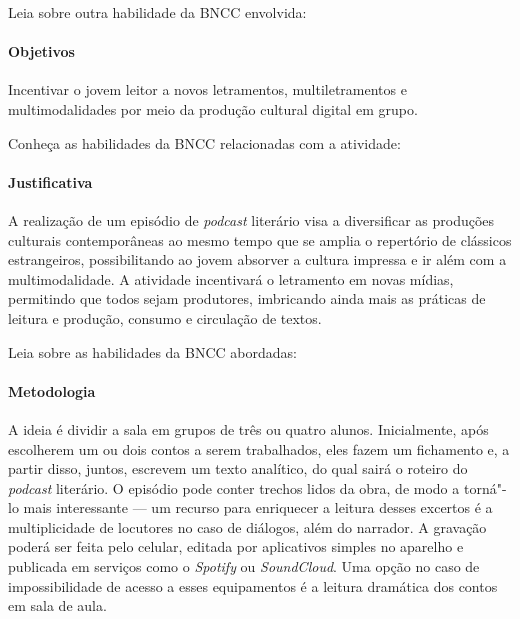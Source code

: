 \documentclass[11pt]{extarticle}
\begin{document}
Leia sobre outra habilidade da BNCC envolvida:

\paragraph{Objetivos}
Incentivar o jovem leitor a novos letramentos, multiletramentos e
multimodalidades por meio da produção cultural digital em grupo.


Conheça as habilidades da BNCC relacionadas com a atividade:

\paragraph{Justificativa}
A realização de um episódio de \emph{podcast} literário visa a
diversificar as produções culturais contemporâneas ao mesmo tempo que se
amplia o repertório de clássicos estrangeiros, possibilitando ao jovem
absorver a cultura impressa e ir além com a multimodalidade. A atividade
incentivará o letramento em novas mídias, permitindo que todos sejam
produtores, imbricando ainda mais as práticas de leitura e produção,
consumo e circulação de textos.

Leia sobre as habilidades da BNCC abordadas:

\paragraph{Metodologia}
A ideia é dividir a sala em grupos de três ou quatro alunos.
Inicialmente, após escolherem um ou dois contos a serem trabalhados,
eles fazem um fichamento e, a partir disso, juntos, escrevem um
texto analítico, do qual sairá o roteiro do \emph{podcast} literário. O
episódio pode conter trechos lidos da obra, de modo a torná"-lo mais
interessante --- um recurso para enriquecer a leitura desses excertos é
a multiplicidade de locutores no caso de diálogos, além do narrador. A
gravação poderá ser feita pelo celular, editada por aplicativos simples
no aparelho e publicada em serviços como o \emph{Spotify} ou
\emph{SoundCloud}. Uma opção no caso de impossibilidade de acesso a
esses equipamentos é a leitura dramática dos contos em sala de aula.
\end{document}
